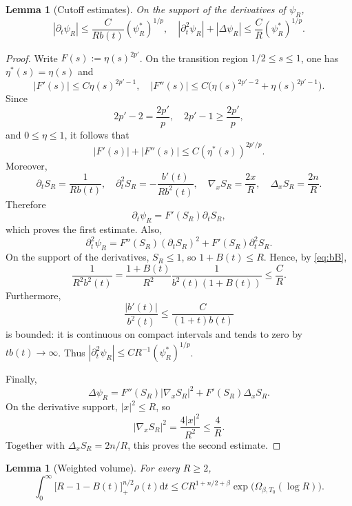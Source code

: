 \documentclass[11pt,reqno]{amsart}
\newtheorem{lemma}[theorem]{Lemma}
\theoremstyle{definition}
\theoremstyle{remark}
\begin{document}
	\begin{lemma}[Cutoff estimates]
		\label{lem:cutoff}
		On the support of the derivatives of $\psi_R$,
		$$
		|\partial_t\psi_R|
		\leq\frac{C}{Rb(t)}(\psi_R^*)^{1/p}, \quad |\partial_t^2\psi_R|+|\Delta\psi_R|
		\leq\frac{C}{R}(\psi_R^*)^{1/p}.
		$$
	\end{lemma}
	
	\begin{proof}
		Write $F(s):=\eta(s)^{2p'}$. On the transition region $1/2\leq s\leq1$, one has $\eta^*(s)=\eta(s)$ and
		$$
		|F'(s)|\leq C\eta(s)^{2p'-1},
		\quad
		|F''(s)|\leq C\bigl(\eta(s)^{2p'-2}+\eta(s)^{2p'-1}\bigr).
		$$
		Since
		$$
		2p'-2=\frac{2p'}{p},
		\quad
		2p'-1\geq\frac{2p'}{p},
		$$
		and $0\leq\eta\leq1$, it follows that
		$$
		|F'(s)|+|F''(s)|\leq C(\eta^*(s))^{2p'/p}.
		$$
		Moreover,
		$$
		\partial_tS_R=\frac{1}{Rb(t)},
		\quad
		\partial_t^2S_R=-\frac{b'(t)}{Rb^2(t)},
		\quad
		\nabla_xS_R=\frac{2x}{R},
		\quad
		\Delta_xS_R=\frac{2n}{R}.
		$$
		Therefore
		$$
		\partial_t\psi_R=F'(S_R)\partial_tS_R,
		$$
		which proves the first estimate. Also,
		$$
		\partial_t^2\psi_R
		=F''(S_R)(\partial_tS_R)^2+F'(S_R)\partial_t^2S_R.
		$$
		On the support of the derivatives, $S_R\leq1$, so $1+B(t)\leq R$. Hence, by \eqref{eq:bB},
		$$
		\frac{1}{R^2b^2(t)}
		=\frac{1+B(t)}{R^2}\frac{1}{b^2(t)(1+B(t))}
		\leq\frac{C}{R}.
		$$
		Furthermore,
		$$
		\frac{|b'(t)|}{b^2(t)}
		\leq\frac{C}{(1+t)b(t)}
		$$
		is bounded: it is continuous on compact intervals and tends to zero by $tb(t)\to\infty$. Thus $|\partial_t^2\psi_R|\leq C R^{-1}(\psi_R^*)^{1/p}$.
		
		Finally,
		$$
		\Delta\psi_R
		=F''(S_R)|\nabla_xS_R|^2+F'(S_R)\Delta_xS_R.
		$$
		On the derivative support, $|x|^2\leq R$, so
		$$
		|\nabla_xS_R|^2=\frac{4|x|^2}{R^2}\leq\frac4R.
		$$
		Together with $\Delta_xS_R=2n/R$, this proves the second estimate.
	\end{proof}
	
	\begin{lemma}[Weighted volume]
		\label{lem:volume}
		For every $R\geq2$,
		$$
		\int_0^\infty
		\bigl[R-1-B(t)\bigr]_+^{n/2}\rho(t)\mathrm{d}t
		\leq CR^{1+n/2+\beta}
		\exp\bigl(\Omega_{\beta,T_0}(\log R)\bigr).
		$$
	\end{lemma}
	
\end{document}
